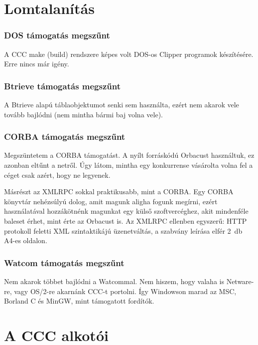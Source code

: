 \section{Lomtalanítás} 

\subsubsection*{DOS támogatás megszűnt}
A CCC make (build) rendszere képes volt DOS-os Clipper
programok készítésére. Erre nincs már igény.

\subsubsection*{Btrieve támogatás megszűnt}
A Btrieve alapú táblaobjektumot senki sem használta,
ezért nem akarok vele tovább bajlódni (nem mintha bármi
baj volna vele).

\subsubsection*{CORBA támogatás megszűnt}
Megszüntetem a CORBA  támogatást. A nyílt forráskódú Orbacust
használtuk, ez azonban eltűnt a netről. Úgy látom, mintha egy 
konkurrense vásárolta volna fel a céget csak azért, hogy ne legyenek. 

Másrészt az XMLRPC sokkal praktikusabb, mint a CORBA. 
Egy CORBA könyvtár nehézsúlyú dolog, amit magunk aligha fogunk megírni, 
ezért használatával hozzákötnénk magunkat egy külső  szoftvercéghez,
akit  mindenféle baleset érhet, mint érte az Orbacust is.
Az XMLRPC ellenben egyszerű: HTTP protokoll feletti XML 
szintaktikájú üzenetváltás, a szabvány leírása elfér 2~db A4-es oldalon. 



\subsubsection*{Watcom támogatás megszűnt}
Nem akarok többet bajlódni a Watcommal. Nem hiszem,
hogy valaha is Netware-re, vagy OS/2-re akarnánk CCC-t portolni.
Így Windowson marad az MSC, Borland C és MinGW, 
mint támogatott fordítók. 

\section{A CCC alkotói}
 

